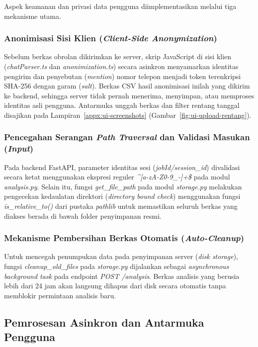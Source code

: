 Aspek keamanan dan privasi data pengguna diimplementasikan melalui tiga mekanisme utama.

\subsubsection{Anonimisasi Sisi Klien (\textit{Client-Side Anonymization})}
Sebelum berkas obrolan dikirimkan ke server, skrip JavaScript di sisi klien (\textit{chatParser.ts} dan \textit{anonimization.ts}) secara asinkron menyamarkan identitas pengirim dan penyebutan (\textit{mention}) nomor telepon menjadi token terenkripsi SHA-256 dengan garam (\textit{salt}). Berkas CSV hasil anonimisasi inilah yang dikirim ke backend, sehingga server tidak pernah menerima, menyimpan, atau memproses identitas asli pengguna. Antarmuka unggah berkas dan filter rentang tanggal disajikan pada Lampiran~\ref{appx:ui-screenshots} (Gambar~\ref{fig:ui-upload-rentang}).

\subsubsection{Pencegahan Serangan \textit{Path Traversal} dan Validasi Masukan (\textit{Input})}
Pada backend FastAPI, parameter identitas sesi (\textit{jobId/session\_id}) divalidasi secara ketat menggunakan ekspresi reguler \textit{\textasciicircum[a-zA-Z0-9\_-]+\$} pada modul \textit{analysis.py}. Selain itu, fungsi \textit{get\_file\_path} pada modul \textit{storage.py} melakukan pengecekan kedaulatan direktori (\textit{directory bound check}) menggunakan fungsi \textit{is\_relative\_to()} dari pustaka \textit{pathlib} untuk memastikan seluruh berkas yang diakses berada di bawah folder penyimpanan resmi.

\subsubsection{Mekanisme Pembersihan Berkas Otomatis (\textit{Auto-Cleanup})}
Untuk mencegah penumpukan data pada penyimpanan server (\textit{disk storage}), fungsi \textit{cleanup\_old\_files} pada \textit{storage.py} dijalankan sebagai \textit{asynchronous background task} pada endpoint \textit{POST /analysis}. Berkas analisis yang berusia lebih dari 24 jam akan langsung dihapus dari disk secara otomatis tanpa memblokir permintaan analisis baru.

\subsection{Pemrosesan Asinkron dan Antarmuka Pengguna}
\label{subsec:async-ui-features}

